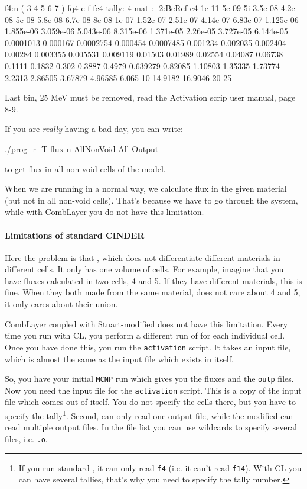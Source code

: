 \begin{mcnp}
f4:n ( 3 4 5 6 7 )
fq4   e f
fc4 tally: 4 mat : -2:BeRef
e4    1e-11 5e-09 5i 3.5e-08 4.2e-08 5e-08 5.8e-08 6.7e-08 8e-08 1e-07
        1.52e-07 2.51e-07 4.14e-07 6.83e-07 1.125e-06 1.855e-06
        3.059e-06 5.043e-06 8.315e-06 1.371e-05 2.26e-05 3.727e-05
        6.144e-05 0.0001013 0.000167 0.0002754 0.000454 0.0007485
        0.001234 0.002035 0.002404 0.00284 0.003355 0.005531 0.009119
        0.01503 0.01989 0.02554 0.04087 0.06738 0.1111 0.1832 0.302
        0.3887 0.4979 0.639279 0.82085 1.10803 1.35335 1.73774 2.2313
        2.86505 3.67879 4.96585 6.065 10 14.9182 16.9046 20 25
\end{mcnp}
\alert{Last bin, 25 MeV must be removed, read the Activation scrip user manual, page 8-9.}

If you are {\em really} having a bad day, you can write:
\begin{bash}
./prog -r -T flux n AllNonVoid All Output
\end{bash}
to get flux in all non-void cells of the model.

When we are running \cinder in a normal way, we calculate flux in the given material (but not in all non-void cells).
That's because we have to go through the \cinder system, while with CombLayer you do not have this limitation.

\paragraph{Limitations of standard CINDER}
Here the problem is that \cinder, which does not differentiate different materials in different cells.
It only has one volume of cells. For example, imagine that you have fluxes calculated in two cells, 4 and 5.
If they have different materials, this is fine. When they both made from the same material, \cinder does not care about 4 and 5, it only cares about
their union.

CombLayer coupled with Stuart-modified \cinder does not have this limitation. Every time you run \cinder with CL, you perform a different run of \cinder for each individual cell.
Once you have done this, you run the {\tt activation} script. It takes an input file, which is almost the same as the input file which exists in \cinder itself.

So, you have your initial {\tt MCNP} run which gives you the fluxes and the {\tt outp} files. Now you need the input file for the {\tt activation} script.
This is a copy of the input file which comes out of \cinder itself. You do not specify the cells there, but you have to specify the tally\footnote{If you run standard \cinder,
it can only read {\tt f4} (i.e. it can't read {\tt f14}). With CL you can have several tallies, that's why you need to specify the tally number.}.
Second, \cinder can only read one output file, while the modified \cinder can read multiple output files.
In the file list you can use wildcards to specify several files, i.e. {\tt *.o}.

